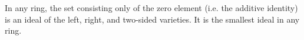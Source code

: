 \documentclass{article}
\begin{document}
In any ring, the set consisting only of the zero element (i.e. the additive identity) is an ideal of the left, right, and two-sided varieties.  It is the smallest ideal in any ring.
\end{document}
